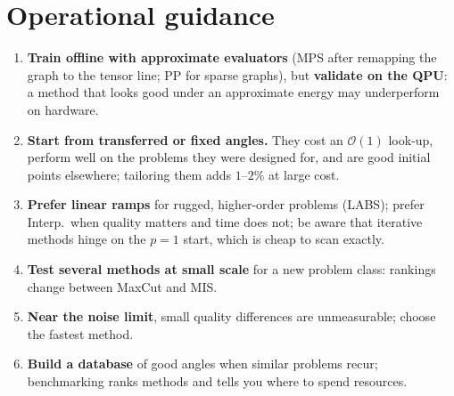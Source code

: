 \documentclass[handoutsbeamer.tex]{subfiles}
\begin{document}
\section{Operational guidance}

\begin{frame}
\onp{\footnotesize}
\begin{enumerate}\setlength\itemsep{0.2em}
    \item \textbf{Train offline with approximate evaluators} (MPS after remapping the graph to the tensor line; PP for sparse graphs), but \textbf{validate on the QPU}: a method that looks good under an approximate energy may underperform on hardware.
    \item \textbf{Start from transferred or fixed angles.} They cost an $\mathcal O(1)$ look-up, perform well on the problems they were designed for, and are good initial points elsewhere; tailoring them adds $1$--$2\%$ at large cost.
    \item \textbf{Prefer linear ramps} for rugged, higher-order problems (LABS); prefer Interp.\ when quality matters and time does not; be aware that iterative methods hinge on the $p=1$ start, which is cheap to scan exactly.
    \item \textbf{Test several methods at small scale} for a new problem class: rankings change between MaxCut and MIS.
    \item \textbf{Near the noise limit}, small quality differences are unmeasurable; choose the fastest method.
    \item \textbf{Build a database} of good angles when similar problems recur; benchmarking ranks methods and tells you where to spend resources.
\end{enumerate}
\end{frame}

\begin{frame}[allowframebreaks]
\biblio
\end{frame}
\end{document}
